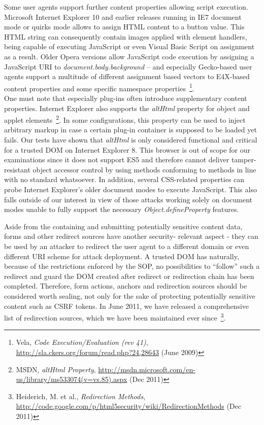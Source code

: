       Some user agents support further content properties allowing script execution. Microsoft Internet Explorer 10 and earlier releases running in IE7 document mode or quirks mode allows to assign HTML content to a button value. This HTML string can consequently contain images applied with element handlers, being capable of executing JavaScript or even Visual Basic Script on assignment as a result. Older Opera versions allow JavaScript code execution by assigning a JavaScript URI to \textit{document.body.background} -- and especially Gecko-based user agents support a multitude of different assignment based vectors to E4X-based content properties and some specific namespace properties~\footnote{Vela, \textit{Code Execution/Evaluation (rev 41)}, \url{http://sla.ckers.org/forum/read.php?24,28643} (June 2009)}. \\

      One must note that especially plug-ins often introduce supplementary content properties. Internet Explorer also supports the \textit{altHtml} property for object and applet elements~\footnote{MSDN, \textit{altHtml Property}, \url{http://msdn.microsoft.com/en-us/library/ms533074(v=vs.85).aspx} (Dec 2011)}. In some configurations, this property can be used to inject arbitrary markup in case a certain plug-in container is supposed to be loaded yet fails. Our tests have shown that \textit{altHtml} is only considered functional and critical for a trusted DOM on Internet Explorer 8. This browser is out of scope for our examinations since it does not support ES5 and therefore cannot deliver tamper-resistant object accessor control by using methods conforming to methods in line with no standard whatsoever. In addition, several CSS-related properties can probe Internet Explorer's older document modes to execute JavaScript. This also falls outside of our interest in view of those attacks working solely on document modes unable to fully support the necessary \textit{Object.defineProperty} features.

      Aside from the containing and submitting potentially sensitive content data, forms and other redirect sources have another security- relevant aspect - they can be used by an attacker to redirect the user agent to a different domain or even different URI scheme for attack deployment. A trusted DOM has naturally, because of the restrictions enforced by the SOP, no possibilities to ``follow'' such a redirect and guard the DOM created after redirect or redirection chain has been completed. Therefore, form actions, anchors and redirection sources should be considered worth sealing, not only for the sake of protecting potentially sensitive content such as CSRF tokens. In June 2011, we have released a comprehensive list of redirection sources, which we have been maintained ever since~\footnote{Heiderich, M. et al., \textit{Redirection Methods}, \url{http://code.google.com/p/html5security/wiki/RedirectionMethods} (Dec 2011)}.

